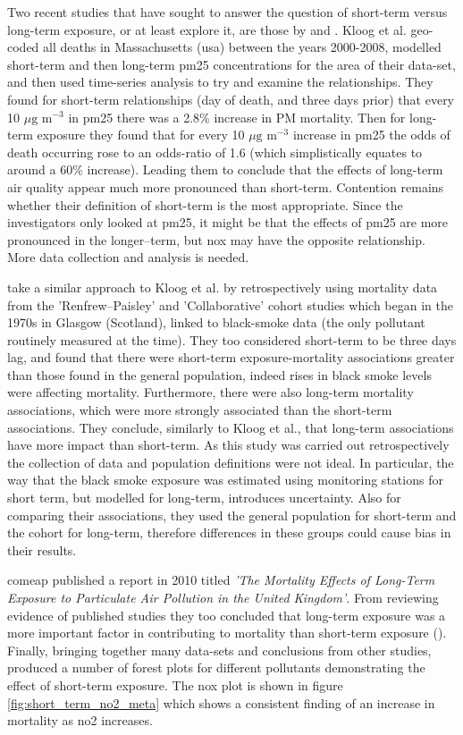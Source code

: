 Two recent studies that have sought to answer the question of short-term versus long-term exposure, or at least explore it, are those by \cite{Kloog2013} and \cite{Beverland2012a}. Kloog et al. geo-coded all deaths in Massachusetts (\gls{usa}) between the years 2000-2008, modelled short-term and then long-term \gls{pm25} concentrations for the area of their data-set, and then used time-series analysis to try and examine the relationships. They found for short-term relationships (day of death, and three days prior) that every 10 $\mu \text{g m}^{-3}$ in \gls{pm25} there was a 2.8\% increase in PM mortality. Then for long-term exposure they found that for every 10 $\mu \text{g m}^{-3}$ increase in \gls{pm25} the odds of death occurring rose to an odds-ratio of 1.6 (which simplistically equates to around a 60\% increase). Leading them to conclude that the effects of long-term air quality appear much more pronounced than short-term. Contention remains whether their definition of short-term is the most appropriate. Since the investigators only looked at \gls{pm25}, it might be that the effects of \gls{pm25} are more pronounced in the longer--term, but \gls{nox} may have the opposite relationship. More data collection and analysis is needed.

\cite{Beverland2012a} take a similar approach to Kloog et al. by retrospectively using mortality data from the 'Renfrew--Paisley' and 'Collaborative' cohort studies which began in the 1970s in Glasgow (Scotland), linked to black-smoke data (the only pollutant routinely measured at the time). They too considered short-term to be three days lag, and found that there were short-term exposure-mortality associations greater than those found in the general population, indeed rises in black smoke levels were affecting mortality. Furthermore, there were also long-term mortality associations, which were more strongly associated than the short-term associations. They conclude, similarly to Kloog et al., that long-term associations have more impact than short-term. As this study was carried out retrospectively the collection of data and population definitions were not ideal. In particular, the way that the black smoke exposure was estimated using monitoring stations for short term, but modelled for long-term, introduces uncertainty. Also for comparing their associations, they used the general population for short-term and the cohort for long-term, therefore differences in these groups could cause bias in their results.

\gls{comeap} published a report in 2010 titled \textit{'The Mortality Effects of Long-Term Exposure to Particulate Air Pollution in the United Kingdom'}. From reviewing evidence of published studies they too concluded that long-term exposure was a more important factor in contributing to mortality than short-term exposure (\cite{CommitteeontheMedicalEffectsofAirPollution2010}). Finally, bringing together many data-sets and conclusions from other studies, \cite{Stieb2002} produced a number of forest plots for different pollutants demonstrating the effect of short-term exposure. The \gls{nox} plot is shown in figure \ref{fig:short_term_no2_meta} which shows a consistent finding of an increase in mortality as \gls{no2} increases.


